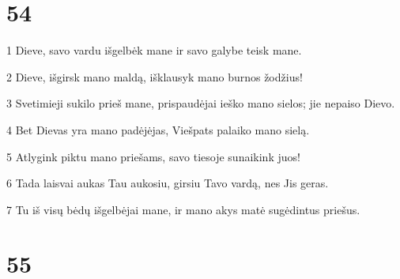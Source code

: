 \chapter{54}


\par 1 Dieve, savo vardu išgelbėk mane ir savo galybe teisk mane. 
\par 2 Dieve, išgirsk mano maldą, išklausyk mano burnos žodžius! 
\par 3 Svetimieji sukilo prieš mane, prispaudėjai ieško mano sielos; jie nepaiso Dievo. 
\par 4 Bet Dievas yra mano padėjėjas, Viešpats palaiko mano sielą. 
\par 5 Atlygink piktu mano priešams, savo tiesoje sunaikink juos! 
\par 6 Tada laisvai aukas Tau aukosiu, girsiu Tavo vardą, nes Jis geras. 
\par 7 Tu iš visų bėdų išgelbėjai mane, ir mano akys matė sugėdintus priešus.



\chapter{55}


